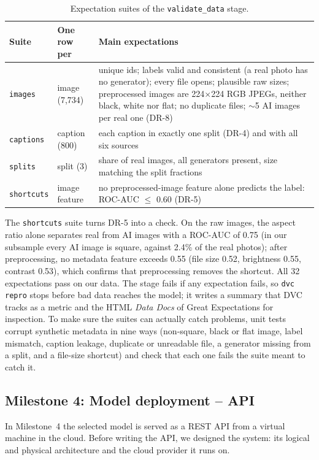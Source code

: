 \documentclass[11pt]{article}
\begin{document}
\begin{table}[H]
\centering
\small
\begin{tabularx}{\textwidth}{@{}l l Y@{}}
\toprule
\textbf{Suite} & \textbf{One row per} & \textbf{Main expectations} \\
\midrule
\texttt{images} & image (7{,}734) & unique ids; labels valid and consistent (a real photo has no generator); every file opens; plausible raw sizes; preprocessed images are 224$\times$224 RGB JPEGs, neither black, white nor flat; no duplicate files; $\sim$5 AI images per real one (DR-8) \\
\texttt{captions} & caption (800) & each caption in exactly one split (DR-4) and with all six sources \\
\texttt{splits} & split (3) & share of real images, all generators present, size matching the split fractions \\
\texttt{shortcuts} & image feature & no preprocessed-image feature alone predicts the label: ROC-AUC $\leq$ 0.60 (DR-5) \\
\bottomrule
\end{tabularx}
\caption{Expectation suites of the \texttt{validate\_data} stage.}
\label{tab:suites}
\end{table}

\medskip
\medskip

The \texttt{shortcuts} suite turns DR-5 into a check. On the raw images, the aspect ratio alone separates real from AI images with a ROC-AUC of 0.75 (in our subsample every AI image is square, against 2.4\% of the real photos); after preprocessing, no metadata feature exceeds 0.55 (file size 0.52, brightness 0.55, contrast 0.53), which confirms that preprocessing removes the shortcut. All 32 expectations pass on our data. The stage fails if any expectation fails, so \texttt{dvc repro} stops before bad data reaches the model; it writes a summary that DVC tracks as a metric and the HTML \emph{Data Docs} of Great Expectations for inspection. To make sure the suites can actually catch problems, unit tests corrupt synthetic metadata in nine ways (non-square, black or flat image, label mismatch, caption leakage, duplicate or unreadable file, a generator missing from a split, and a file-size shortcut) and check that each one fails the suite meant to catch it.

\subsection{Milestone 4: Model deployment -- API}
In Milestone~4 the selected model is served as a REST API from a virtual machine in the cloud. Before writing the API, we designed the system: its logical and physical architecture and the cloud provider it runs on.
\end{document}
